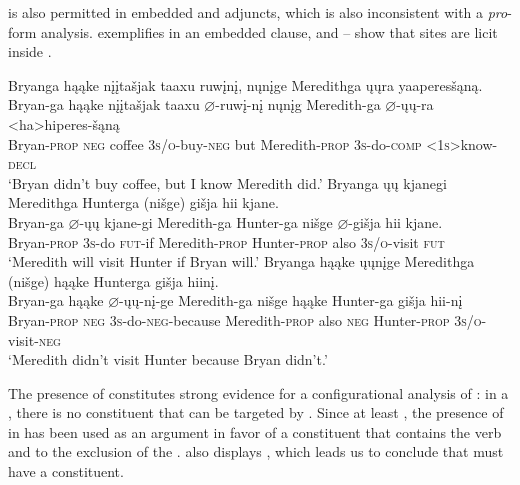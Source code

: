 \documentclass[output=paper]{LSP/langsci}
\begin{document}
 is also permitted in embedded  and adjuncts, which is also inconsistent with a \textit{pro}-form analysis.  exemplifies  in an embedded clause, and -- show that  sites are licit inside  .

\ea\label{ex:jrs:43}
\ea\label{ex:jrs:43a}
\glll Bryanga	hąąke	{n\k{i}\k{i}ta\v{s}jak taaxu}		ruw\k{i}n\k{i},		n\k{u}n\k{i}ge		Meredithga \k{u}\k{u}ra 	yaaperes\v{s}ąną. \\
Bryan-ga hąąke	{n\k{i}\k{i}ta\v{s}jak taaxu} $\varnothing$-ruw\k{i}-n\k{i} n\k{u}n\k{i}g	Meredith-ga $\varnothing$-\k{u}\k{u}-ra	<ha>hiperes-\v{s}ąną \\
Bryan-\textsc{prop}	\textsc{neg}	coffee	 \textsc{3s/o}-buy-\textsc{neg} but	 Meredith-\textsc{prop} \textsc{3s}-do-\textsc{comp}	\textsc{<1s>}know-\textsc{decl} \\
\trans `Bryan didn't buy coffee, but I know Meredith did.'
\ex \label{ex:jrs:43b}
\glll Bryanga	\k{u}\k{u}	kjanegi	Meredithga	Hunterga	(ni\v{s}ge)	 {gi\v{s}ja hii} kjane.\\
Bryan-ga	$\varnothing$-\k{u}\k{u}  kjane-gi	 Meredith-ga	Hunter-ga	ni\v{s}ge  {$\varnothing$-gi\v{s}ja hii} kjane. \\
Bryan-\textsc{prop} \textsc{3s}-do	\textsc{fut}-if	 Meredith-\textsc{prop} Hunter-\textsc{prop}	 also	 \textsc{3s/o}-visit	 \textsc{fut} \\
\trans `Meredith will visit Hunter if Bryan will.'
\ex \label{ex:jrs:43c}
\glll Bryanga			hąąke	\k{u}\k{u}n\k{i}ge	Meredithga		(ni\v{s}ge)		hąąke Hunterga	{gi\v{s}ja hiin\k{i}.}\\
Bryan-ga	hąąke	$\varnothing$-\k{u}\k{u}-n\k{i}-ge	Meredith-ga	 ni\v{s}ge	hąąke  Hunter-ga  {gi\v{s}ja hii-n\k{i}} \\
Bryan-\textsc{prop}	\textsc{neg}	\textsc{3s}-do-\textsc{neg}-because Meredith-\textsc{prop} also	\textsc{neg} Hunter-\textsc{prop} \textsc{3s/o}-visit-\textsc{neg} \\
\trans `Meredith didn't visit Hunter because Bryan didn't.'
\z
\z

The presence of  constitutes strong evidence for a configurational analysis of : in a , there is no  constituent that can be targeted by . Since at least \citet{Ross1969}, the presence of  in  has been used as an argument in favor of a  constituent that contains the verb and  to the exclusion of the .  also displays , which leads us to conclude that  must have a  constituent.
\end{document}
